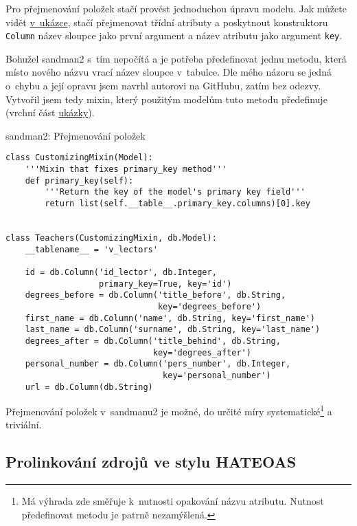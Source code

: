 Pro přejmenování položek stačí provést jednoduchou úpravu modelu. Jak můžete vidět \protect\hyperlink{code:sandman2:rename}{v~ukázce}, stačí přejmenovat třídní atributy a poskytnout konstruktoru \verb!Column! název sloupce jako první argument a název atributu jako argument \verb!key!.

Bohužel sandman2 s~tím nepočítá a je potřeba předefinovat jednu metodu, která místo nového názvu vrací název sloupce v~tabulce. Dle mého názoru se jedná o~chybu a její opravu jsem navrhl autorovi na GitHubu, zatím bez odezvy. Vytvořil jsem tedy mixin, který použitým modelům tuto metodu předefinuje (vrchní část \protect\hyperlink{code:sandman2:rename}{ukázky}).

\begin{listing}[htbp]
\caption{{\label{code:sandman2:rename}sandman2: Přejmenování položek}}
\begin{verbatim}
class CustomizingMixin(Model):
    '''Mixin that fixes primary_key method'''
    def primary_key(self):
        '''Return the key of the model's primary key field'''
        return list(self.__table__.primary_key.columns)[0].key


class Teachers(CustomizingMixin, db.Model):
    __tablename__ = 'v_lectors'

    id = db.Column('id_lector', db.Integer,
                   primary_key=True, key='id')
    degrees_before = db.Column('title_before', db.String,
                               key='degrees_before')
    first_name = db.Column('name', db.String, key='first_name')
    last_name = db.Column('surname', db.String, key='last_name')
    degrees_after = db.Column('title_behind', db.String,
                              key='degrees_after')
    personal_number = db.Column('pers_number', db.Integer,
                                key='personal_number')
    url = db.Column(db.String)
\end{verbatim}
\end{listing}

Přejmenování položek v~sandmanu2 je možné, do určité míry systematické\footnote{Má výhrada zde směřuje k~nutnosti opakování názvu atributu. Nutnost předefinovat metodu je patrně nezamýšlená.} a triviální.

\subsection{Prolinkování zdrojů ve stylu HATEOAS}\label{prolinkovuxe1nuxed-zdrojux16f-ve-stylu-hateoas}


